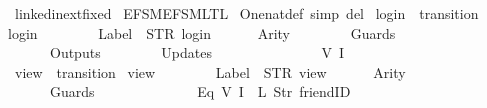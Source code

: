 %
\begin{isabellebody}%
%
%
\isadelimtheory
%
\endisadelimtheory
%
\isatagtheory
{}\isamarkupfalse%
\ linkedin{\isacharunderscore}ext{\isacharunderscore}fixed\isanewline
{}\ {\isachardoublequoteopen}EFSM{\isachardot}EFSM{\isacharunderscore}LTL{\isachardoublequoteclose}\isanewline
{}%
\endisatagtheory
{\isafoldtheory}%
%
\isadelimtheory
\isanewline
%
\endisadelimtheory
\isanewline
{}\isamarkupfalse%
\ One{\isacharunderscore}nat{\isacharunderscore}def\ {\isacharbrackleft}simp\ del{\isacharbrackright}\isanewline
\isanewline
{}\isamarkupfalse%
\ {\isachardoublequoteopen}login{\isachardoublequoteclose}\ {\isacharcolon}{\isacharcolon}\ {\isachardoublequoteopen}transition{\isachardoublequoteclose}\ \isanewline
{\isachardoublequoteopen}login\ {\isasymequiv}\ {\isasymlparr}\isanewline
\ \ \ \ \ \ Label\ {\isacharequal}\ STR\ {\isacharprime}{\isacharprime}login{\isacharprime}{\isacharprime}{\isacharcomma}\isanewline
\ \ \ \ \ \ Arity\ {\isacharequal}\ {}{\isacharcomma}\isanewline
\ \ \ \ \ \ Guards\ {\isacharequal}\ {\isacharbrackleft}{\isacharbrackright}{\isacharcomma}\isanewline
\ \ \ \ \ \ Outputs\ {\isacharequal}\ {\isacharbrackleft}{\isacharbrackright}{\isacharcomma}\isanewline
\ \ \ \ \ \ Updates\ {\isacharequal}\ {\isacharbrackleft}\isanewline
\ \ \ \ \ \ \ \ \ \ \ \ {\isacharparenleft}{}{\isacharcomma}\ {\isacharparenleft}V\ {\isacharparenleft}I\ {}{\isacharparenright}{\isacharparenright}{\isacharparenright}\isanewline
\ \ \ \ \ \ {\isacharbrackright}\isanewline
{\isasymrparr}{\isachardoublequoteclose}\isanewline
\isanewline
{}\isamarkupfalse%
\ {\isachardoublequoteopen}view{\isachardoublequoteclose}\ {\isacharcolon}{\isacharcolon}\ {\isachardoublequoteopen}transition{\isachardoublequoteclose}\ \isanewline
{\isachardoublequoteopen}view\ {\isasymequiv}\ {\isasymlparr}\isanewline
\ \ \ \ \ \ Label\ {\isacharequal}\ STR\ {\isacharprime}{\isacharprime}view{\isacharprime}{\isacharprime}{\isacharcomma}\isanewline
\ \ \ \ \ \ Arity\ {\isacharequal}\ {}{\isacharcomma}\isanewline
\ \ \ \ \ \ Guards\ {\isacharequal}\ {\isacharbrackleft}\isanewline
\ \ \ \ \ \ \ \ \ \ \ \ Eq\ {\isacharparenleft}V\ {\isacharparenleft}I\ {}{\isacharparenright}{\isacharparenright}\ {\isacharparenleft}L\ {\isacharparenleft}Str\ {\isacharprime}{\isacharprime}friendID{\isacharprime}{\isacharprime}{\isacharparenright}{\isacharparenright}{\isacharcomma}\isanewline

\end{isabellebody}
